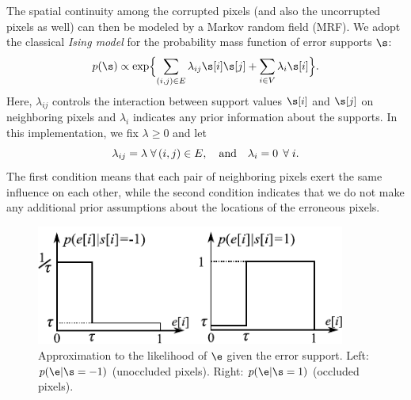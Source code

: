 The spatial continuity among the corrupted pixels (and also the uncorrupted pixels as well) can then be modeled by a Markov random field (MRF). We adopt the classical {\em Ising model} for the probability mass function of error supports $\s$:
\begin{equation}
p(\s) \propto \exp\Bigl\{\sum_{(i,j)\in
E}\lambda_{ij}\s[i]\s[j] + \sum_{i\in V}\lambda_i \s[i]\Bigr\}.
\label{eqn:ising}
\end{equation}
Here, $\lambda_{ij}$ controls the interaction between support values $\s[i]$ and $\s[j]$ on neighboring pixels and $\lambda_i$ indicates any prior information about the supports. In this implementation, we fix $\lambda \ge 0$ and let \vspace{0mm}
\begin{displaymath}
{\lambda}_{ij} = \lambda \;\forall\,(i,j) \in E, \quad \mbox{and} \quad \lambda_i = 0 \;\,\forall\;i. \vspace{0mm}
\end{displaymath}
The first condition means that each pair of neighboring pixels exert the same influence on each other, while the second condition indicates that we do not make any additional prior assumptions about the locations of the erroneous pixels.

\begin{figure} 
\centerline{\includegraphics[width=4.0in]{figures_iccv/function.pdf}}
\caption{Approximation to the likelihood of $\e$ given the error support. Left: $p(\e|\s = -1)$ (unoccluded pixels). Right: $p(\e|\s = 1)$ (occluded pixels).} \label{fig:likelihood} \vspace{0mm}
\end{figure}


